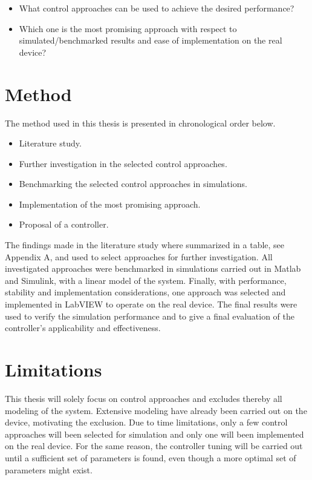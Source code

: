 \begin{itemize}
  \item What control approaches can be used to achieve the desired performance?
  \item Which one is the most promising approach with respect to simulated/benchmarked results and ease of implementation on the real device?
\end{itemize}

\section{Method}
The method used in this thesis is presented in chronological order below.

\begin{itemize}
  \item Literature study.
  \item Further investigation in the selected control approaches.
  \item Benchmarking the selected control approaches in simulations.
  \item Implementation of the most promising approach.
  \item Proposal of a controller.
\end{itemize}

The findings made in the literature study where summarized in a table, see Appendix A, and used to select approaches for further investigation.
All investigated approaches were benchmarked in simulations carried out in Matlab and Simulink, with a linear model of the system. Finally, with performance, stability and implementation considerations, one approach was selected and implemented in LabVIEW to operate on the real device. The final results were used to verify the simulation performance and to give a final evaluation of the controller's applicability and effectiveness.

\section{Limitations}
This thesis will solely focus on control approaches and excludes thereby all modeling of the system. Extensive modeling have already been carried out on the device, motivating the exclusion. Due to time limitations, only a few control approaches will been selected for simulation and only one will been implemented on the real device. For the same reason, the controller tuning will be carried out until a sufficient set of parameters is found, even though a more optimal set of parameters might exist.

